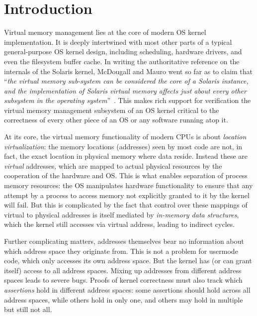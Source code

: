 \section{Introduction}
\label{sec:intro}
Virtual memory management lies at the core of modern OS kernel implementation. It is deeply intertwined with most other parts of a typical general-purpose OS kernel design, including scheduling, hardware drivers, and even the filesystem buffer cache. In writing the authoritative reference on the internals of the Solaris kernel, McDougall and Mauro went so far as to claim that ``\emph{the virtual memory sub-system can be considered the core of a Solaris instance, and the implementation of Solaris virtual memory affects just about every other subsystem in the operating system}''~\cite{mcdougall2006solaris}.
This makes rich support for verification the virtual memory management subsystem of an OS kernel critical to the correctness of every other piece of an OS or any software running atop it.

At its core, the virtual memory functionality of modern CPUs is about \emph{location virtualization}: the memory locations
(addresses) seen by most code are not, in fact, the exact location in physical memory where data reside. Instead these 
are \emph{virtual} addresses, which are mapped to actual physical resources by the cooperation of the hardware and OS. 
This is what enables separation of process memory resources:
the OS manipulates hardware functionality to ensure that any attempt by a process to access memory not explicitly granted 
to it by the kernel will fail. But this is complicated by the fact that 
control over these mappings of virtual to physical addresses is itself mediated by \emph{in-memory data structures}, 
which the kernel still accesses via virtual address, leading to indirect cycles.

Further complicating matters, addresses themselves bear no information about which address space they originate 
from. 
This is not a problem for usermode code, which only accesses its own address space.
But the kernel has
(or can grant itself) access to all address spaces. Mixing up addresses from different address spaces leads to severe bugs.
Proofs of kernel correctness must also track which \emph{assertions} hold in different address spaces:
some assertions should hold across all address spaces, while others hold in only one, and others may hold in 
multiple but still not all.

